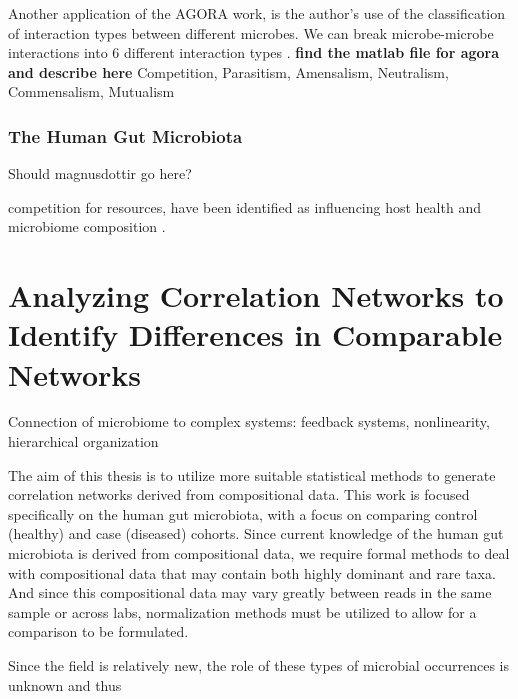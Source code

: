 Another application of the \acrshort{AGORA} work, is the author's use of the classification of interaction types between different microbes. We can break microbe-microbe interactions into 6 different interaction types \citep{Magnusdottir2016}. \textbf{find the matlab file for agora and describe here} Competition, Parasitism, Amensalism, Neutralism, Commensalism, Mutualism


\subsubsection{The Human Gut Microbiota}
Should magnusdottir go here?

competition for resources, have been identified as influencing host health and microbiome composition \citep{Hacquard2015}. 

\section{Analyzing Correlation Networks to Identify Differences in Comparable Networks}\label{intro-overall}

Connection of microbiome to complex systems: feedback systems, nonlinearity, hierarchical organization 

The aim of this thesis is to utilize more suitable statistical methods to generate correlation networks derived from compositional data. This work is focused specifically on the human gut microbiota, with a focus on comparing control (healthy) and case (diseased) cohorts. Since current knowledge of the human gut microbiota is derived from compositional data, we require formal methods to deal with compositional data that may contain both highly dominant and rare taxa. And since this compositional data may vary greatly between reads in the same sample or across labs, normalization methods must be utilized to allow for a comparison to be formulated.

Since the field is relatively new, the role of these types of microbial occurrences is unknown and thus  


